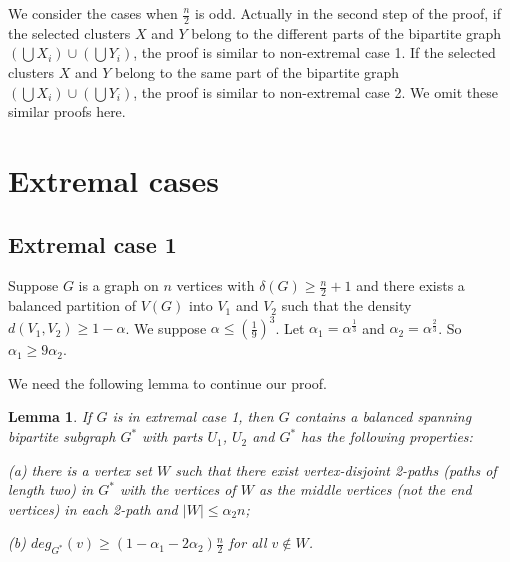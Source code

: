 \documentclass[11pt]{article}
\newtheorem{lemma}{Lemma}
\begin{document}
We consider the cases when $\frac{n}{2}$ is odd. Actually in the second step of the proof, if the selected clusters $X$ and $Y$ belong to the different parts of the bipartite graph $(\bigcup X_i)\cup (\bigcup Y_i)$, the proof is similar to non-extremal case 1. If the selected clusters $X$ and $Y$ belong to the same part of the bipartite graph $(\bigcup X_i)\cup (\bigcup Y_i)$, the proof is similar to non-extremal case 2. We omit these similar proofs here.




\section{Extremal cases}

\subsection{Extremal case 1}
Suppose $G$ is a graph on $n$ vertices with $\delta (G)\geq \frac{n}{2}+1$ and there exists a balanced partition of $V(G)$ into $V_1$ and $V_2$ such that the density $d(V_1,V_2)\geq 1-\alpha$.
We suppose $\alpha \leq (\frac{1}{9})^3$. Let $\alpha_1=\alpha ^{\frac{1}{3}}$ and $\alpha_2=\alpha ^{\frac{2}{3}}$. So $\alpha_1 \geq 9\alpha_2 $.

We need the following lemma to continue our proof.

\begin{lemma}\label{ec1}
If $G$ is in extremal case 1, then $G$ contains a balanced spanning bipartite subgraph $G^*$ with parts $U_1$, $U_2$ and $G^{*}$ has the following properties:

(a) there is a vertex set $W$ such that there exist vertex-disjoint 2-paths (paths of length two) in $G^{*}$ with the vertices of $W$ as the middle vertices (not the end vertices) in each 2-path and $|W|\leq \alpha_2n$;

(b) $deg_{G^*}(v)\geq (1-\alpha_1-2\alpha_2)\frac{n}{2}$ for all $v\not \in W$.
\end{lemma}
\end{document}
